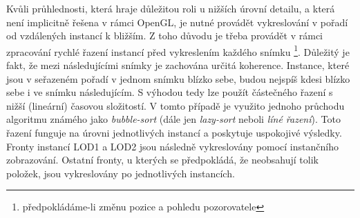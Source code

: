 Kvůli průhlednosti, která hraje důležitou roli u nižších úrovní detailu, a která není implicitně řešena v rámci OpenGL, je nutné provádět vykreslování v pořadí od vzdálených instancí k bližším. Z toho důvodu je třeba provádět v rámci zpracování rychlé řazení instancí před vykreslením každého snímku \footnote{předpokládáme-li změnu pozice a pohledu pozorovatele}. Důležitý je fakt, že mezi následujícími snímky je zachována určitá koherence. Instance, které jsou v seřazeném pořadí v jednom snímku blízko sebe, budou nejspíš kdesi blízko sebe i ve snímku následujícím. S výhodou tedy lze použít částečného řazení s nižší (lineární) časovou složitostí. V tomto případě je využito jednoho průchodu algoritmu známého jako \emph{bubble-sort} (dále jen \emph{lazy-sort} neboli \emph{líné řazení}). Toto řazení funguje na úrovni jednotlivých instancí a poskytuje uspokojivé výsledky. 
Fronty instancí LOD1 a LOD2 jsou následně vykreslovány pomocí instančního zobrazování. Ostatní fronty, u kterých se předpokládá, že neobsahují tolik položek, jsou vykreslovány po jednotlivých instancích.
